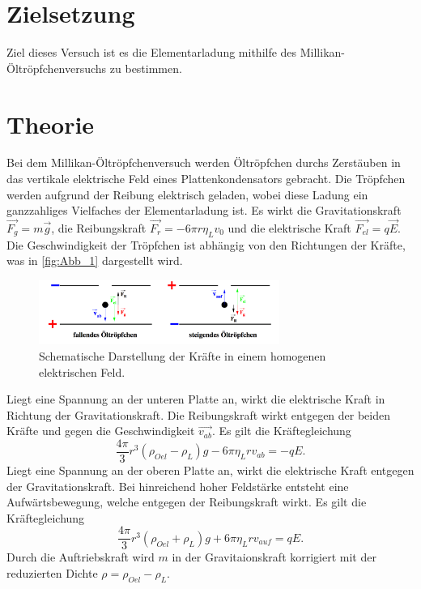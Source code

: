 \section{Zielsetzung}
\label{sec:Zielsetzung}
Ziel dieses Versuch ist es die Elementarladung mithilfe des Millikan-Öltröpfchenversuchs zu bestimmen.
\section{Theorie}
\label{sec:Theorie}
Bei dem Millikan-Öltröpfchenversuch werden Öltröpfchen durchs Zerstäuben in das vertikale
elektrische Feld eines Plattenkondensators gebracht. Die Tröpfchen werden aufgrund der Reibung
elektrisch geladen, wobei diese Ladung ein ganzzahliges Vielfaches der Elementarladung ist.
Es wirkt die Gravitationskraft $\vec{F_g}=m \vec{g}$, die Reibungskraft 
$\vec{F_r} = - 6 \pi r \eta_L v_0$ und die elektrische Kraft $\vec{F_{el}} = q \vec{E}$.
Die Geschwindigkeit der Tröpfchen ist abhängig von den Richtungen der Kräfte, was in \autoref{fig:Abb_1} dargestellt wird.
\begin{figure}[H]
    \centering
    \includegraphics[width=0.7\textwidth]{Abbildungen/Abb_1.pdf}
    \caption {Schematische Darstellung der Kräfte in einem homogenen elektrischen Feld\cite[1]{V503}.}
    \label{fig:Abb_1}
\end{figure}
Liegt eine Spannung an der unteren Platte an, wirkt die elektrische Kraft in Richtung der Gravitationskraft.
Die Reibungskraft wirkt entgegen der beiden Kräfte und gegen die Geschwindigkeit $\vec{v_{ab}}$.
Es gilt die Kräftegleichung
\begin{equation}
    \frac{4 \pi}{3} r^3 (\rho_{Oel}-\rho_L)g - 6 \pi \eta_L r v_{ab} = - q E.
    \label{eqn:vab}
\end{equation}
Liegt eine Spannung an der oberen Platte an, wirkt die elektrische Kraft entgegen der Gravitationskraft.
Bei hinreichend hoher Feldstärke entsteht eine Aufwärtsbewegung, welche entgegen der Reibungskraft wirkt.
Es gilt die Kräftegleichung
\begin{equation}
    \frac{4\pi}{3} r^3 (\rho_{Oel}+\rho_L) g + 6 \pi \eta_L r v_{auf} = q E.
    \label{eqn:vauf}
\end{equation}
Durch die Auftriebskraft wird $m$ in der Gravitaionskraft korrigiert mit der reduzierten Dichte $\rho = \rho_{Oel}-\rho_L$.
